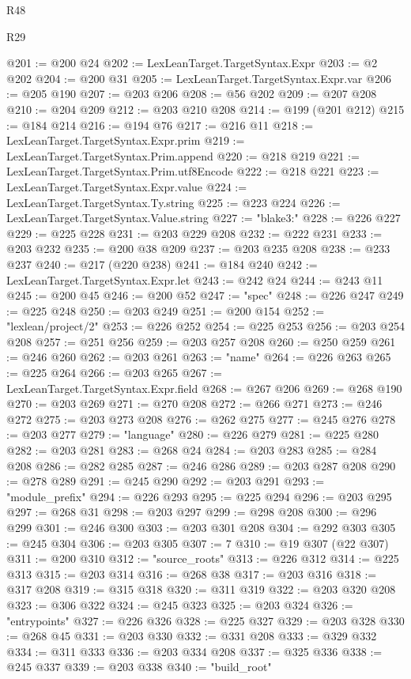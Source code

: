 \begin{lexlean}{R48}
\begin{lexlean}{R29}
\begin{coremodule}
{{{{{{{{{{{{{{{{{{{{{{{{{{{{{{{{{{{{{{{{{{{{{{{{{{{{{{{{{{{{{{{{{{{{{{{{{{{{{{{{{{{{{{{{{{{{{{{{{{{{{{{{{{{{{{{{{{{{{{{{{{{{{{{{{{{{{{{{{{{{{{{{{{{{{{{{{{{{{{{{{{{{{{{{{{{{{{{{{{{{{{{{{{{{{{{{{{{{{{{{{{{{{{{{{{{{{{{{{{@201 := @200 @24
@202 := LexLeanTarget.TargetSyntax.Expr
@203 := @2 @202
@204 := @200 @31
@205 := LexLeanTarget.TargetSyntax.Expr.var
@206 := @205 @190
@207 := @203 @206
@208 := @56 @202
@209 := @207 @208
@210 := @204 @209
@212 := @203 @210 @208
@214 := @199 (@201 @212)
@215 := @184 @214
@216 := @194 @76
@217 := @216 @11
@218 := LexLeanTarget.TargetSyntax.Expr.prim
@219 := LexLeanTarget.TargetSyntax.Prim.append
@220 := @218 @219
@221 := LexLeanTarget.TargetSyntax.Prim.utf8Encode
@222 := @218 @221
@223 := LexLeanTarget.TargetSyntax.Expr.value
@224 := LexLeanTarget.TargetSyntax.Ty.string
@225 := @223 @224
@226 := LexLeanTarget.TargetSyntax.Value.string
@227 := "blake3:"
@228 := @226 @227
@229 := @225 @228
@231 := @203 @229 @208
@232 := @222 @231
@233 := @203 @232
@235 := @200 @38 @209
@237 := @203 @235 @208
@238 := @233 @237
@240 := @217 (@220 @238)
@241 := @184 @240
@242 := LexLeanTarget.TargetSyntax.Expr.let
@243 := @242 @24
@244 := @243 @11
@245 := @200 @45
@246 := @200 @52
@247 := "spec"
@248 := @226 @247
@249 := @225 @248
@250 := @203 @249
@251 := @200 @154
@252 := "lexlean/project/2"
@253 := @226 @252
@254 := @225 @253
@256 := @203 @254 @208
@257 := @251 @256
@259 := @203 @257 @208
@260 := @250 @259
@261 := @246 @260
@262 := @203 @261
@263 := "name"
@264 := @226 @263
@265 := @225 @264
@266 := @203 @265
@267 := LexLeanTarget.TargetSyntax.Expr.field
@268 := @267 @206
@269 := @268 @190
@270 := @203 @269
@271 := @270 @208
@272 := @266 @271
@273 := @246 @272
@275 := @203 @273 @208
@276 := @262 @275
@277 := @245 @276
@278 := @203 @277
@279 := "language"
@280 := @226 @279
@281 := @225 @280
@282 := @203 @281
@283 := @268 @24
@284 := @203 @283
@285 := @284 @208
@286 := @282 @285
@287 := @246 @286
@289 := @203 @287 @208
@290 := @278 @289
@291 := @245 @290
@292 := @203 @291
@293 := "module_prefix"
@294 := @226 @293
@295 := @225 @294
@296 := @203 @295
@297 := @268 @31
@298 := @203 @297
@299 := @298 @208
@300 := @296 @299
@301 := @246 @300
@303 := @203 @301 @208
@304 := @292 @303
@305 := @245 @304
@306 := @203 @305
@307 := 7
@310 := @19 @307 (@22 @307)
@311 := @200 @310
@312 := "source_roots"
@313 := @226 @312
@314 := @225 @313
@315 := @203 @314
@316 := @268 @38
@317 := @203 @316
@318 := @317 @208
@319 := @315 @318
@320 := @311 @319
@322 := @203 @320 @208
@323 := @306 @322
@324 := @245 @323
@325 := @203 @324
@326 := "entrypoints"
@327 := @226 @326
@328 := @225 @327
@329 := @203 @328
@330 := @268 @45
@331 := @203 @330
@332 := @331 @208
@333 := @329 @332
@334 := @311 @333
@336 := @203 @334 @208
@337 := @325 @336
@338 := @245 @337
@339 := @203 @338
@340 := "build_root"
}}}}}}}}}}}}}}}}}}}}}}}}}}}}}}}}}}}}}}}}}}}}}}}}}}}}}}}}}}}}}}}}}}}}}}}}}}}}}}}}}}}}}}}}}}}}}}}}}}}}}}}}}}}}}}}}}}}}}}}}}}}}}}}}}}}}}}}}}}}}}}}}}}}}}}}}}}}}}}}}}}}}}}}}}}}}}}}}}}}}}}}}}}}}}}}}}}}}}}}}}}}}}}}}}}}}}}}}}}
\end{coremodule}
\end{lexlean}
\end{lexlean}
